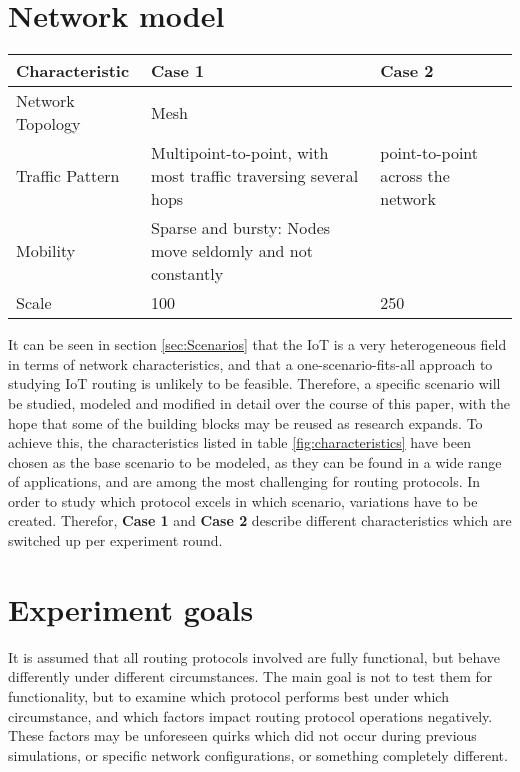 \documentclass{acm_proc_article-sp}
\begin{document}
\section{Network model}
\label{sec:Model}
\begin{table*}[t]
    \begin{tabularx}{\textwidth}{l | X | X  }
      Characteristic & Case 1 & Case 2 \\
      \hline
      Network Topology & Mesh & \\
      Traffic Pattern & Multipoint-to-point, with most traffic traversing several hops & point-to-point across the network \\
      Mobility & Sparse and bursty: Nodes move seldomly and not constantly & \\
      Scale & 100 & 250\\
    \end{tabularx}
    \caption{Characteristics of the modeled network(s)}
    \label{fig:characteristics}
\end{table*}

It can be seen in section \ref{sec:Scenarios} that the IoT is a very heterogeneous field in terms of network characteristics, and that a one-scenario-fits-all approach to studying IoT routing is unlikely to be feasible. Therefore, a specific scenario will be studied, modeled and modified in detail over the course of this paper, with the hope that some of the building blocks may be reused as research expands. To achieve this, the characteristics listed in table \ref{fig:characteristics} have been chosen as the base scenario to be modeled, as they can be found in a wide range of applications, and are among the most challenging for routing protocols.
In order to study which protocol excels in which scenario, variations have to be created. Therefor, \textbf{Case 1} and \textbf{Case 2} describe different characteristics which are switched up per experiment round.


\section{Experiment goals}
\label{sec:Goals}
It is assumed that all routing protocols involved are fully functional, but behave differently under different circumstances. The main goal is not to test them for functionality, but to examine which protocol performs best under which circumstance, and which factors impact routing protocol operations negatively. These factors may be unforeseen quirks which did not occur during previous simulations, or specific network configurations, or something completely different.
\end{document}
